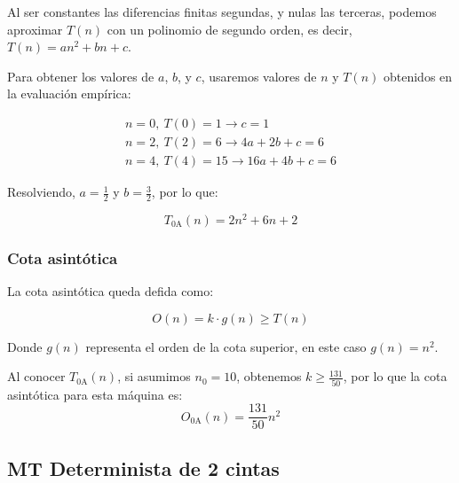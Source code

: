Al ser constantes las diferencias finitas segundas, y nulas las terceras, podemos aproximar $T(n)$ con un polinomio de segundo orden, es decir, $T(n) = an^2 + bn + c$.\medskip

Para obtener los valores de $a$, $b$, y $c$, usaremos valores de $n$ y $T(n)$ obtenidos en la evaluación empírica:

\begin{subequations}
    \begin{gather}
        n = 0,\ T(0) = 1 \rightarrow c = 1 \\
        n = 2,\ T(2) = 6 \rightarrow 4a + 2b + c = 6 \\
        n = 4,\ T(4) = 15 \rightarrow 16a + 4b + c = 6
    \end{gather}
\end{subequations}

Resolviendo, $a=\frac{1}{2}$ y $b=\frac{3}{2}$, por lo que:

\begin{equation}
    T_{\mathrm{0A}}(n) = 2n^2 + 6n + 2
\end{equation}


\subsubsection*{Cota asintótica}
La cota asintótica queda defida\parencite[ver][Definition 7.2 (p. 277)]{SipserMichael2013Ittt} como:

\begin{equation}
    O(n) = k \cdot g(n) \geq T(n)
    \label{eq:On}
\end{equation}

Donde $g(n)$ representa el orden de la cota superior, en este caso $g(n) = n^2$.\medskip

Al conocer $T_{\mathrm{0A}}(n)$, si asumimos $n_0 = 10$, obtenemos $k \geq \frac{131}{50}$, por lo que la cota asintótica para esta máquina es:
\begin{equation}
    O_{\mathrm{0A}}(n) = \frac{131}{50} n^2
\end{equation}





\subsection{MT Determinista de 2 cintas}

